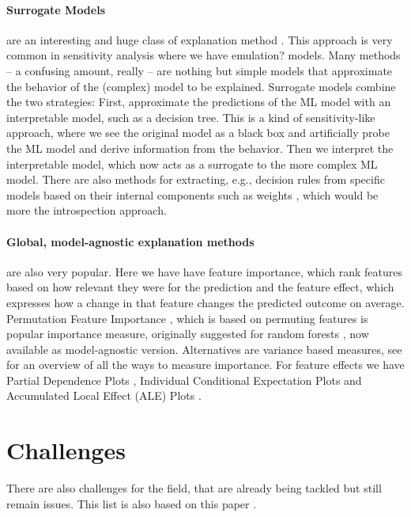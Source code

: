 \documentclass[runningheads]{llncs}
\begin{document}
\paragraph{Surrogate Models} are an interesting and huge class of explanation method \cite{puri2017magix,molnar2019,ming2018rulematrix}.
This approach is very common in sensitivity analysis where we have emulation? models.
Many methods -- a confusing amount, really -- are nothing but simple models that approximate the behavior of the (complex) model to be explained.
Surrogate models combine the two strategies:
First, approximate the predictions of the ML model with an interpretable model, such as a decision tree.
This is a kind of sensitivity-like approach, where we see the original model as a black box and artificially probe the ML model and derive information from the behavior.
Then we interpret the interpretable model, which now acts as a surrogate to the more complex ML model.
There are also methods for extracting, e.g., decision rules from specific models based on their internal components such as weights \cite{andrews1995survey,augasta2012rule}, which would be more the introspection approach.

\paragraph{Global, model-agnostic explanation methods} are also very popular.
Here we have have feature importance, which rank features based on how relevant they were for the prediction and the feature effect, which expresses how a change in that feature changes the predicted outcome on average.
Permutation Feature Importance \cite{fisher2019all}, which is based on permuting features is popular importance measure, originally suggested for random forests \cite{breiman2001random}, now available as model-agnostic version.
Alternatives are variance based measures, see \cite{wei2015variable} for an overview of all the ways to measure importance.
For feature effects we have Partial Dependence Plots \cite{friedman2001greedy}, Individual Conditional Expectation Plots \cite{goldstein2015peeking} and Accumulated Local Effect  (ALE)  Plots \cite{apley2016visualizing}.


\section{Challenges}

There are also challenges for the field, that are already being tackled but still remain issues.
This list is also based on this paper \cite{molnar2020pitfalls}.
\end{document}

